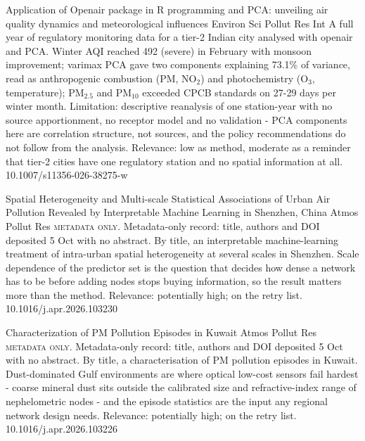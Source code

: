 \documentclass[10pt]{article}
\begin{document}
\par{}\baselineskip{}\baselineskip
{}

{Application of Openair package in R programming and PCA: unveiling air quality dynamics and meteorological influences}
{Environ Sci Pollut Res Int}
{A full year of regulatory monitoring data for a tier-2 Indian city analysed with openair and PCA. Winter AQI reached 492 (severe) in February with monsoon improvement; varimax PCA gave two components explaining 73.1\% of variance, read as anthropogenic combustion (PM, NO$_2$) and photochemistry (O$_3$, temperature); PM$_{2.5}$ and PM$_{10}$ exceeded CPCB standards on 27-29 days per winter month. Limitation: descriptive reanalysis of one station-year with no source apportionment, no receptor model and no validation - PCA components here are correlation structure, not sources, and the policy recommendations do not follow from the analysis. Relevance: low as method, moderate as a reminder that tier-2 cities have one regulatory station and no spatial information at all.}
{10.1007/s11356-026-38275-w}

{Spatial Heterogeneity and Multi-scale Statistical Associations of Urban Air Pollution Revealed by Interpretable Machine Learning in Shenzhen, China}
{Atmos Pollut Res}
{\textsc{metadata only.} Metadata-only record: title, authors and DOI deposited 5 Oct with no abstract. By title, an interpretable machine-learning treatment of intra-urban spatial heterogeneity at several scales in Shenzhen. Scale dependence of the predictor set is the question that decides how dense a network has to be before adding nodes stops buying information, so the result matters more than the method. Relevance: potentially high; on the retry list.}
{10.1016/j.apr.2026.103230}

{Characterization of PM Pollution Episodes in Kuwait}
{Atmos Pollut Res}
{\textsc{metadata only.} Metadata-only record: title, authors and DOI deposited 5 Oct with no abstract. By title, a characterisation of PM pollution episodes in Kuwait. Dust-dominated Gulf environments are where optical low-cost sensors fail hardest - coarse mineral dust sits outside the calibrated size and refractive-index range of nephelometric nodes - and the episode statistics are the input any regional network design needs. Relevance: potentially high; on the retry list.}
{10.1016/j.apr.2026.103226}
\end{document}
